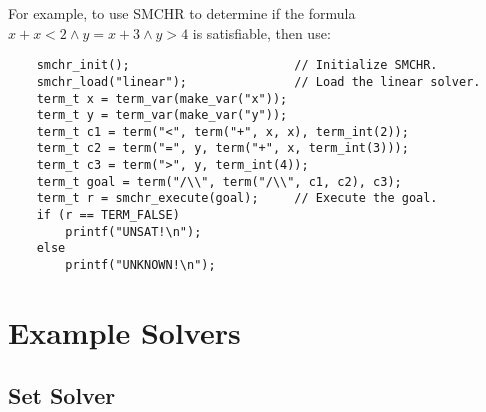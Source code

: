 \documentclass{article}
\begin{document}
For example, to use SMCHR to determine if the formula
$x + x < 2 \land y = x + 3 \land y > 4$ is satisfiable, then use:
\begin{verbatim}
    smchr_init();                       // Initialize SMCHR.
    smchr_load("linear");               // Load the linear solver.
    term_t x = term_var(make_var("x"));
    term_t y = term_var(make_var("y"));
    term_t c1 = term("<", term("+", x, x), term_int(2));
    term_t c2 = term("=", y, term("+", x, term_int(3)));
    term_t c3 = term(">", y, term_int(4));
    term_t goal = term("/\\", term("/\\", c1, c2), c3);
    term_t r = smchr_execute(goal);     // Execute the goal.
    if (r == TERM_FALSE)
        printf("UNSAT!\n");
    else
        printf("UNKNOWN!\n");
\end{verbatim}

\section{Example Solvers}

\subsection{Set Solver}
\end{document}
